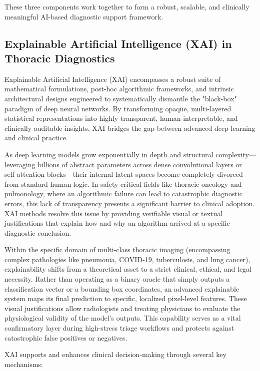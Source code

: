 These three components work together to form a robust, scalable, and clinically meaningful AI-based diagnostic support framework.



\subsection{Explainable Artificial Intelligence (XAI) in Thoracic Diagnostics}
\label{subsec:explainable_ai}

Explainable Artificial Intelligence (XAI) encompasses a robust suite of mathematical formulations, post-hoc algorithmic frameworks, and intrinsic architectural designs engineered to systematically dismantle the "black-box" paradigm of deep neural networks. By transforming opaque, multi-layered statistical representations into highly transparent, human-interpretable, and clinically auditable insights, XAI bridges the gap between advanced deep learning and clinical practice. 

As deep learning models grow exponentially in depth and structural complexity—leveraging billions of abstract parameters across dense convolutional layers or self-attention blocks—their internal latent spaces become completely divorced from standard human logic. In safety-critical fields like thoracic oncology and pulmonology, where an algorithmic failure can lead to catastrophic diagnostic errors, this lack of transparency presents a significant barrier to clinical adoption. XAI methods resolve this issue by providing verifiable visual or textual justifications that explain how and why an algorithm arrived at a specific diagnostic conclusion.

Within the specific domain of multi-class thoracic imaging (encompassing complex pathologies like pneumonia, COVID-19, tuberculosis, and lung cancer), explainability shifts from a theoretical asset to a strict clinical, ethical, and legal necessity. Rather than operating as a binary oracle that simply outputs a classification vector or a bounding box coordinates, an advanced explainable system maps its final prediction to specific, localized pixel-level features. These visual justifications allow radiologists and treating physicians to evaluate the physiological validity of the model's outputs. This capability serves as a vital confirmatory layer during high-stress triage workflows and protects against catastrophic false positives or negatives.

XAI supports and enhances clinical decision-making through several key mechanisms:

